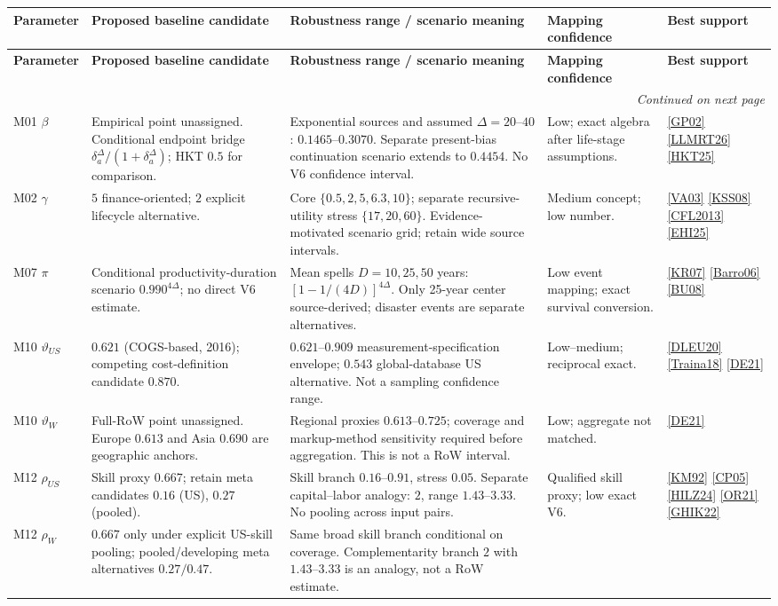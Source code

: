 \documentclass[10pt,a4paper,landscape]{article}
\makeatletter
\newcommand{\src}[1]{\hyperlink{ref:#1}{\textsf{[#1]}}}
\newenvironment{recommendations}{%
\fontsize{9.4}{10.9}\selectfont\setlength{\parskip}{2pt}
\begin{longtable}{@{}P{\dimexpr .14\textwidth-8pt\relax}P{\dimexpr .25\textwidth-8pt\relax}P{\dimexpr .32\textwidth-8pt\relax}P{\dimexpr .15\textwidth-8pt\relax}P{\dimexpr .14\textwidth-8pt\relax}@{}}
\toprule\rowcolor{tablehead}\textbf{Parameter} & \textbf{Proposed baseline candidate} & \textbf{Robustness range / scenario meaning} & \textbf{Mapping confidence} & \textbf{Best support}\\\midrule
\endfirsthead
\toprule\rowcolor{tablehead}\textbf{Parameter} & \textbf{Proposed baseline candidate} & \textbf{Robustness range / scenario meaning} & \textbf{Mapping confidence} & \textbf{Best support}\\\midrule
\endhead
\midrule\multicolumn{5}{r}{\footnotesize\itshape Continued on next page}\\\endfoot
\bottomrule\endlastfoot
}{\end{longtable}}
\makeatother
\begin{document}
\begin{recommendations}
M01 $\beta$
& Empirical point unassigned. Conditional endpoint bridge
$\delta_a^\Delta/(1+\delta_a^\Delta)$; HKT $0.5$ for comparison.
& Exponential sources and assumed $\Delta=20$--$40$: $0.1465$--$0.3070$.
Separate present-bias continuation scenario extends to $0.4454$.
No V6 confidence interval.
& Low; exact algebra after life-stage assumptions.
& \src{GP02} \src{LLMRT26} \src{HKT25}\\[5pt]
M02 $\gamma$
& $5$ finance-oriented; $2$ explicit lifecycle alternative.
& Core $\{0.5,2,5,6.3,10\}$; separate recursive-utility stress
$\{17,20,60\}$. Evidence-motivated scenario grid; retain wide source intervals.
& Medium concept; low number.
& \src{VA03} \src{KSS08} \src{CFL2013} \src{EHI25}\\[5pt]
M07 $\pi$
& Conditional productivity-duration scenario $0.990^{4\Delta}$;
no direct V6 estimate.
& Mean spells $D=10,25,50$ years:
$[1-1/(4D)]^{4\Delta}$.
Only 25-year center source-derived; disaster events are separate alternatives.
& Low event mapping; exact survival conversion.
& \src{KR07} \src{Barro06} \src{BU08}\\[5pt]
M10 $\vartheta_{US}$
& $0.621$ (COGS-based, 2016); competing cost-definition candidate $0.870$.
& $0.621$--$0.909$ measurement-specification envelope;
$0.543$ global-database US alternative.
Not a sampling confidence range.
& Low--medium; reciprocal exact.
& \src{DLEU20} \src{Traina18} \src{DE21}\\[5pt]
M10 $\vartheta_W$
& Full-RoW point unassigned. Europe $0.613$ and Asia $0.690$ are geographic anchors.
& Regional proxies $0.613$--$0.725$;
coverage and markup-method sensitivity required before aggregation.
This is not a RoW interval.
& Low; aggregate not matched.
& \src{DE21}\\[5pt]
M12 $\rho_{US}$
& Skill proxy $0.667$; retain meta candidates $0.16$ (US), $0.27$ (pooled).
& Skill branch $0.16$--$0.91$, stress $0.05$.
Separate capital--labor analogy: $2$, range $1.43$--$3.33$.
No pooling across input pairs.
& Qualified skill proxy; low exact V6.
& \src{KM92} \src{CP05} \src{HILZ24} \src{OR21} \src{GHIK22}\\[5pt]
M12 $\rho_W$
& $0.667$ only under explicit US-skill pooling;
pooled/developing meta alternatives $0.27/0.47$.
& Same broad skill branch conditional on coverage.
Complementarity branch $2$ with $1.43$--$3.33$ is an analogy, not a RoW estimate.

\end{recommendations}
\end{document}
